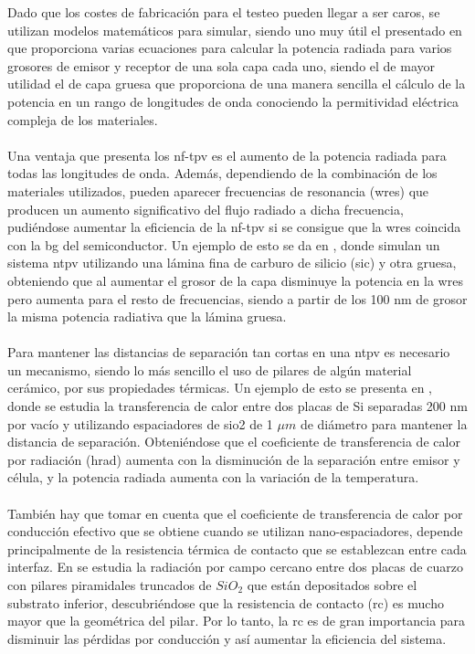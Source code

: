 Dado que los costes de fabricación para el testeo pueden llegar a ser caros, se utilizan modelos matemáticos para simular, siendo uno muy útil el presentado en \cite{nfTPV_equations} que proporciona varias ecuaciones para calcular la potencia radiada para varios grosores de emisor y receptor de una sola capa cada uno, siendo el de mayor utilidad el de capa gruesa que proporciona de una manera sencilla el cálculo de la potencia en un rango de longitudes de onda conociendo la permitividad eléctrica compleja de los materiales.\\\\
Una ventaja que presenta los \acrshort{nf-tpv} es el aumento de la potencia radiada para todas las longitudes de onda. Además, dependiendo de la combinación de los materiales utilizados, pueden aparecer frecuencias de resonancia (\gls{wres}) que producen un aumento significativo del flujo radiado a dicha frecuencia, pudiéndose aumentar la eficiencia de la \acrshort{nf-tpv} si se consigue que la \gls{wres} coincida con la \acrshort{bg} del semiconductor. Un ejemplo de esto se da en \cite{doi:Near_field_ThinFilm}, donde simulan un sistema \acrshort{ntpv} utilizando una lámina fina de carburo de silicio (\gls{sic}) y otra gruesa, obteniendo que al aumentar el grosor de la capa disminuye la potencia en la \gls{wres} pero aumenta para el resto de frecuencias, siendo a partir de los 100 nm de grosor la misma potencia radiativa que la lámina gruesa.\\\\
Para mantener las distancias de separación tan cortas en una \acrshort{ntpv} es necesario un mecanismo, siendo lo más sencillo el uso de pilares de algún material cerámico, por sus propiedades térmicas. Un ejemplo de esto se presenta en \cite{NearField200}, donde se estudia la transferencia de calor entre dos placas de Si separadas 200 nm por vacío y utilizando espaciadores de \gls{sio2} de 1 $\mu m$ de diámetro para mantener la distancia de separación. Obteniéndose que el coeficiente de transferencia de calor por radiación (\gls{hrad}) aumenta con la disminución de la separación entre emisor y célula, y la potencia radiada aumenta con la variación de la temperatura.\\\\
También hay que tomar en cuenta que el coeficiente de transferencia de calor por conducción efectivo que se obtiene cuando se utilizan nano-espaciadores, depende principalmente de la resistencia térmica de contacto que se establezcan entre cada interfaz. En \cite{nf_TPV_Pillars_SiO2} se estudia la radiación por campo cercano entre dos placas de cuarzo con pilares piramidales truncados de $SiO_2$ que están depositados sobre el substrato inferior, descubriéndose que la resistencia de contacto (\acrshort{rc}) es mucho mayor que la geométrica del pilar. Por lo tanto, la \acrshort{rc} es de gran importancia para disminuir las pérdidas por conducción y así aumentar la eficiencia del sistema.
